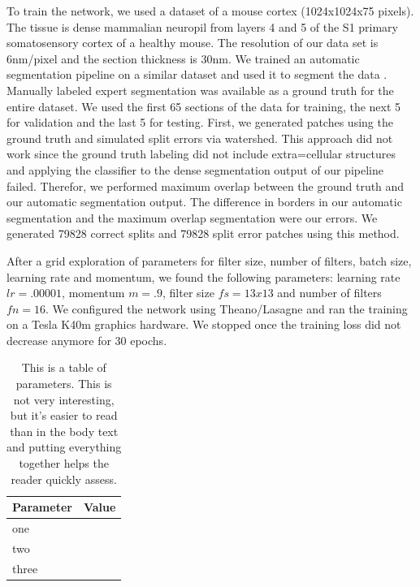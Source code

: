 To train the network, we used a dataset of a mouse cortex (1024x1024x75 pixels). The tissue is dense mammalian neuropil from layers 4 and 5 of the S1 primary somatosensory cortex of a healthy mouse. The resolution of our data set is 6nm/pixel and the section thickness is 30nm. We trained an automatic segmentation pipeline on a similar dataset and used it to segment the data \cite{rhoana}. Manually labeled expert segmentation was available as a ground truth for the entire dataset. We used the first 65 sections of the data for training, the next 5 for validation and the last 5 for testing.
%
First, we generated patches using the ground truth and simulated split errors via watershed. This approach did not work since the ground truth labeling did not include extra=cellular structures and applying the classifier to the dense segmentation output of our pipeline failed. Therefor, we performed maximum overlap between the ground truth and our automatic segmentation output. The difference in borders in our automatic segmentation and the maximum overlap segmentation were our errors. We generated 79828 correct splits and 79828 split error patches using this method.

After a grid exploration of parameters for filter size, number of filters, batch size, learning rate and momentum, we found the following parameters: learning rate $lr=.00001$, momentum $m=.9$, filter size $fs=13x13$ and number of filters $fn=16$. We configured the network using Theano/Lasagne and ran the training on a Tesla K40m graphics hardware. We stopped once the training loss did not decrease anymore for 30 epochs.



\begin{table}
\begin{tabular}{ll}
\toprule
Parameter & Value \\
\midrule
one & \\
two & \\
three & \\
\bottomrule
\end{tabular}
\caption{This is a table of parameters. This is not very interesting, but it's easier to read than in the body text and putting everything together helps the reader quickly assess.}
\end{table}